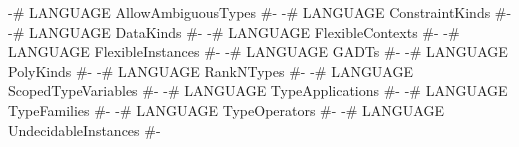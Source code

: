 \begin{code}
{-# LANGUAGE AllowAmbiguousTypes   #-}
{-# LANGUAGE ConstraintKinds       #-}
{-# LANGUAGE DataKinds             #-}
{-# LANGUAGE FlexibleContexts      #-}
{-# LANGUAGE FlexibleInstances     #-}
{-# LANGUAGE GADTs                 #-}
{-# LANGUAGE PolyKinds             #-}
{-# LANGUAGE RankNTypes            #-}
{-# LANGUAGE ScopedTypeVariables   #-}
{-# LANGUAGE TypeApplications      #-}
{-# LANGUAGE TypeFamilies          #-}
{-# LANGUAGE TypeOperators         #-}
{-# LANGUAGE UndecidableInstances  #-}
\end{code}
